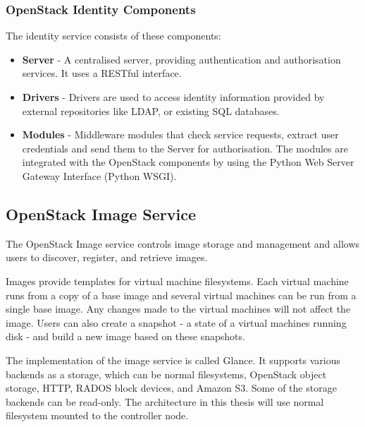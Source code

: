 \subsubsection*{OpenStack Identity Components}

The identity service consists of these components:
\begin{itemize}
  \item{\textbf{Server} - A centralised server, providing authentication and authorisation services. It uses a RESTful interface.}
  \item{\textbf{Drivers} - Drivers are used to access identity information provided by external repositories like LDAP, or existing SQL databases.}
  \item{\textbf{Modules} - Middleware modules that check service requests, extract user credentials and send them to the Server for authorisation. The modules are integrated with the OpenStack components by using the Python Web Server Gateway Interface (Python WSGI).}
 \\\cite{InstallGuide}
\end{itemize}


\subsection{OpenStack Image Service}
The OpenStack Image service controls image storage and management and allows users to discover, register, and retrieve images.

Images provide templates for virtual machine filesystems. Each virtual machine runs from a copy of a base image and several virtual machines can be run from a single base image. Any changes made to the virtual machines will not affect the image. Users can also create a snapshot - a state of a virtual machines running disk - and build a new image based on these snapshots.

The implementation of the image service is called Glance. It supports various backends as a storage, which can be normal filesystems, OpenStack object storage, HTTP, RADOS block devices, and Amazon S3. Some of the storage backends can be read-only. The architecture in this thesis will use normal filesystem mounted to the controller node.

